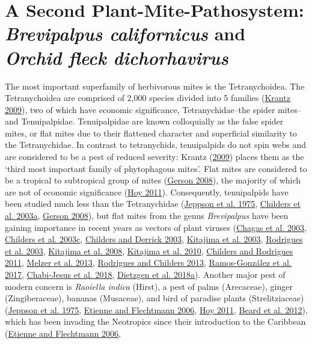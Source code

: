 \documentclass{ufdissertation}[overrideChapters] %
\begin{document}
{\hypertarget{a-second-plant-mite-pathosystem-brevipalpus-californicus-and-orchid-fleck-dichorhavirus}{%
\section{\texorpdfstring{A Second Plant-Mite-Pathosystem: \emph{Brevipalpus californicus} and \emph{Orchid fleck dichorhavirus}}{A Second Plant-Mite-Pathosystem: Brevipalpus californicus and Orchid fleck dichorhavirus}}\label{a-second-plant-mite-pathosystem-brevipalpus-californicus-and-orchid-fleck-dichorhavirus}}

The most important superfamily of herbivorous mites is the Tetranychoidea. The Tetranychoidea are comprised of 2,000 species divided into 5 families (\protect\hyperlink{ref-Krantz2009}{Krantz 2009}), two of which have economic significance, Tetranychidae--the spider mites--and Tenuipalpidae. Tenuipalpidae are known colloquially as the false spider mites, or flat mites due to their flattened character and superficial similarity to the Tetranychidae. In contrast to tetranychids, tenuipalpids do not spin webs and are considered to be a pest of reduced severity: Krantz (\protect\hyperlink{ref-Krantz2009}{2009}) places them as the `third most important family of phytophagous mites'. Flat mites are considered to be a tropical to subtropical group of mites (\protect\hyperlink{ref-Gerson2008}{Gerson 2008}), the majority of which are not of economic significance (\protect\hyperlink{ref-Hoy2011}{Hoy 2011}). Consequently, tenuipalpids have been studied much less than the Tetranychidae (\protect\hyperlink{ref-Jeppson1975}{Jeppson et al. 1975}, \protect\hyperlink{ref-Childers2003b}{Childers et al. 2003a}, \protect\hyperlink{ref-Gerson2008}{Gerson 2008}), but flat mites from the genus \emph{Brevipalpus} have been gaining importance in recent years as vectors of plant viruses (\protect\hyperlink{ref-Chagas2003}{Chagas et al. 2003}, \protect\hyperlink{ref-Childers2003a}{Childers et al. 2003c}, \protect\hyperlink{ref-Childers2003c}{Childers and Derrick 2003}, \protect\hyperlink{ref-Kitajima2003b}{Kitajima et al. 2003}, \protect\hyperlink{ref-Rodrigues2003a}{Rodrigues et al. 2003}, \protect\hyperlink{ref-Kitajima2008}{Kitajima et al. 2008}, \protect\hyperlink{ref-Kitajima2010}{Kitajima et al. 2010}, \protect\hyperlink{ref-Childers2011}{Childers and Rodrigues 2011}, \protect\hyperlink{ref-Melzer2013}{Melzer et al. 2013}, \protect\hyperlink{ref-Rodrigues2013}{Rodrigues and Childers 2013}, \protect\hyperlink{ref-RamosGonzalez2017}{Ramos-González et al. 2017}, \protect\hyperlink{ref-ChabiJesus2018}{Chabi-Jesus et al. 2018}, \protect\hyperlink{ref-Dietzgen2018}{Dietzgen et al. 2018a}). Another major pest of modern concern is \emph{Raoiella indica} (Hirst), a pest of palms (Arecaceae), ginger (Zingiberaceae), bananas (Musaceae), and bird of paradise plants (Strelitziaceae) (\protect\hyperlink{ref-Jeppson1975}{Jeppson et al. 1975}, \protect\hyperlink{ref-Etienne2006}{Etienne and Flechtmann 2006}, \protect\hyperlink{ref-Hoy2011}{Hoy 2011}, \protect\hyperlink{ref-Beard2012a}{Beard et al. 2012}), which has been invading the Neotropics since their introduction to the Caribbean (\protect\hyperlink{ref-Etienne2006}{Etienne and Flechtmann 2006}, }
\end{document}

